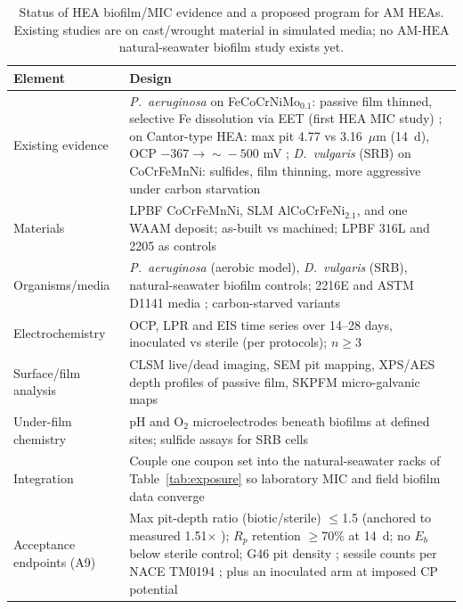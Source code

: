 \begin{table}[t]
\centering
\caption{Status of HEA biofilm/MIC evidence and a proposed program for AM HEAs. Existing studies are on cast/wrought material in simulated media; no AM-HEA natural-seawater biofilm study exists yet.}
\label{tab:biofilm}
\footnotesize
\begin{tabularx}{\textwidth}{@{}lX@{}}
\toprule
Element & Design \\
\midrule
Existing evidence & \emph{P.~aeruginosa} on FeCoCrNiMo$_{0.1}$: passive film thinned, selective Fe dissolution via EET (first HEA MIC study) \cite{lou2020mic}; on Cantor-type HEA: max pit 4.77 vs 3.16~$\mu$m (14~d), OCP $-367\!\to\!\sim\!-500$ mV \cite{mic_cantor2022}; \emph{D.~vulgaris} (SRB) on CoCrFeMnNi: sulfides, film thinning, more aggressive under carbon starvation \cite{wang2023srb} \\
Materials & LPBF CoCrFeMnNi, SLM AlCoCrFeNi$_{2.1}$, and one WAAM deposit; as-built vs machined; LPBF 316L and 2205 as controls \\
Organisms/media & \emph{P.~aeruginosa} (aerobic model), \emph{D.~vulgaris} (SRB), natural-seawater biofilm controls; 2216E and ASTM D1141 media \cite{astm_d1141}; carbon-starved variants \\
Electrochemistry & OCP, LPR and EIS time series over 14--28 days, inoculated vs sterile (per \cite{mic_cantor2022,wang2023srb} protocols); $n\geq3$ \\
Surface/film analysis & CLSM live/dead imaging, SEM pit mapping, XPS/AES depth profiles of passive film, SKPFM micro-galvanic maps \\
Under-film chemistry & pH and O$_2$ microelectrodes beneath biofilms at defined sites; sulfide assays for SRB cells \\
Integration & Couple one coupon set into the natural-seawater racks of Table~\ref{tab:exposure} so laboratory MIC and field biofilm data converge \\
Acceptance endpoints (A9) & Max pit-depth ratio (biotic/sterile) $\leq$1.5 (anchored to measured 1.51$\times$ \cite{mic_cantor2022}); $R_p$ retention $\geq$70\% at 14~d; no $E_b$ below sterile control; G46 pit density \cite{astm_g46}; sessile counts per NACE TM0194 \cite{nace_tm0194}; plus an inoculated arm at imposed CP potential \cite{mic_pipeline2026} \\
\bottomrule
\end{tabularx}
\end{table}
